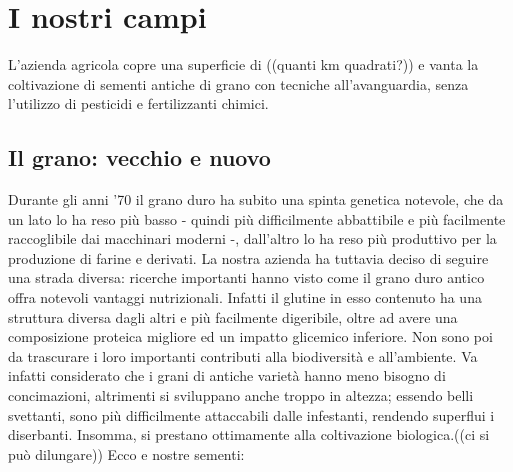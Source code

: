 \section{I nostri campi}
L'azienda agricola copre una superficie di ((quanti km quadrati?)) e vanta la coltivazione di sementi antiche di grano con tecniche all'avanguardia, senza l'utilizzo di pesticidi e fertilizzanti chimici.

\subsection{Il grano: vecchio e nuovo}
Durante gli anni '70 il grano duro ha subito una spinta genetica notevole, che da un lato lo ha reso più basso - quindi più difficilmente abbattibile e più facilmente raccoglibile dai macchinari moderni -, dall'altro lo ha reso più produttivo per la produzione di farine e derivati.
La nostra azienda ha tuttavia deciso di seguire una strada diversa: ricerche importanti hanno visto come il grano duro antico offra notevoli vantaggi nutrizionali. Infatti il glutine in esso contenuto ha una struttura diversa dagli altri e più facilmente digeribile, oltre ad avere una composizione proteica migliore ed un impatto glicemico inferiore.
Non sono poi da trascurare i loro importanti contributi alla biodiversità e all'ambiente. Va infatti considerato che i grani di antiche varietà hanno meno bisogno di concimazioni, altrimenti si sviluppano anche troppo in altezza; essendo belli svettanti, sono più difficilmente attaccabili dalle infestanti, rendendo superflui i diserbanti. Insomma, si prestano ottimamente alla coltivazione biologica.((ci si può dilungare))
Ecco e nostre sementi:
